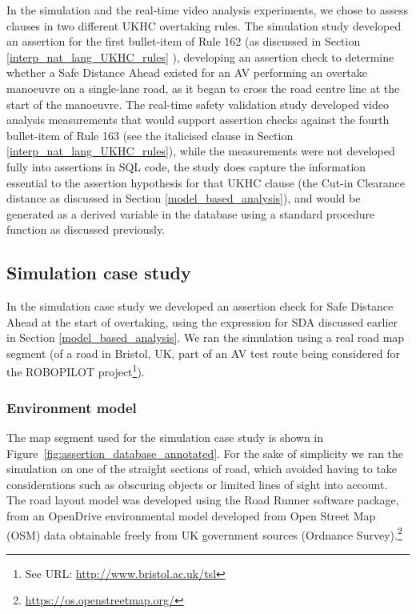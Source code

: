 
In the simulation and the real-time video analysis experiments, we chose to assess clauses in two different UKHC overtaking rules. The simulation study developed an assertion for the first bullet-item of Rule 162 (as discussed in Section \ref{interp_nat_lang_UKHC_rules} 
), developing an assertion check to determine whether a Safe Distance Ahead existed for an AV performing an overtake manoeuvre on a single-lane road, as it began to cross the road centre line at the start of the manoeuvre. The real-time safety validation study developed video analysis measurements that would support assertion checks against the fourth bullet-item of Rule 163 %
(see the italicised clause in Section \ref{interp_nat_lang_UKHC_rules}), 
while the measurements were not developed fully into assertions in SQL code, the study does capture the information essential to the assertion hypothesis for that UKHC clause (the Cut-in Clearance distance as discussed in Section \ref{model_based_analysis}), and would be generated as a derived variable in the database using a standard procedure function as discussed previously.

\subsection{Simulation case study}  \label{sim_case_study}
In the simulation case study we developed an assertion check for Safe Distance Ahead at the start of overtaking, using the expression for SDA discussed earlier in Section \ref{model_based_analysis}. We ran the simulation using a real road map segment (of a road in Bristol, UK, part of an AV test route being considered for the ROBOPILOT project\footnote{See URL: \url{http://www.bristol.ac.uk/tsl}}).

\subsubsection{Environment model}
The map segment used for the simulation case study is shown in 
Figure~\ref{fig:assertion_database_annotated}. For the sake of simplicity we ran the simulation on one of the straight sections of road, which avoided having to take considerations such as obscuring objects or limited lines of sight into account. The road layout model was developed using the Road Runner software package, from an OpenDrive environmental model developed from Open Street Map (OSM) data obtainable freely from UK government sources (Ordnance Survey).\footnote{\url{https://os.openstreetmap.org/}} 

